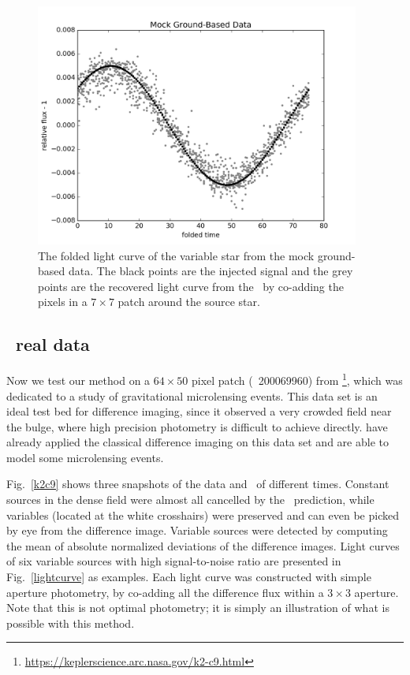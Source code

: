 \begin{figure}[p]
\begin{center}
\includegraphics[width=0.95\textwidth]{figures/cdi/f4a}
\end{center}
\caption{
\label{ground_lc}
 The folded light curve of the variable star from the mock ground-based data.
 The black points are the injected signal and the grey points are the recovered light curve from the \cpmdiff\ by co-adding the pixels in a $7\times 7$ patch around the source star.
}
\end{figure}

\subsection{\KTCN\ real data}
Now we test our method on a $64\times50$ pixel patch (\epic\ 200069960) from \KTCN\footnote{\url{https://keplerscience.arc.nasa.gov/k2-c9.html}}\citep{k2c9}, which was dedicated to a study of gravitational microlensing events.
This data set is an ideal test bed for difference imaging, since it observed a very crowded field near the bulge, where high precision photometry is difficult to achieve directly.
\cite{wei} have already applied the classical difference imaging on this data set and are able to model some microlensing events.

Fig.~\ref{k2c9} shows three snapshots of the data and \cpmdiff\ of different times.
Constant sources in the dense field were almost all cancelled by the \cpm\ prediction, while variables (located at the white crosshairs) were preserved and can even be picked by eye from the difference image.
Variable sources were detected by computing the mean of absolute normalized deviations of the difference images. 
Light curves of six variable sources with high signal-to-noise ratio are presented in Fig.~\ref{lightcurve} as examples. 
Each light curve was constructed with simple aperture photometry, by co-adding all the difference flux within a $3 \times 3$ aperture. 
Note that this is not optimal photometry; it is simply an illustration of what is possible with this method.

